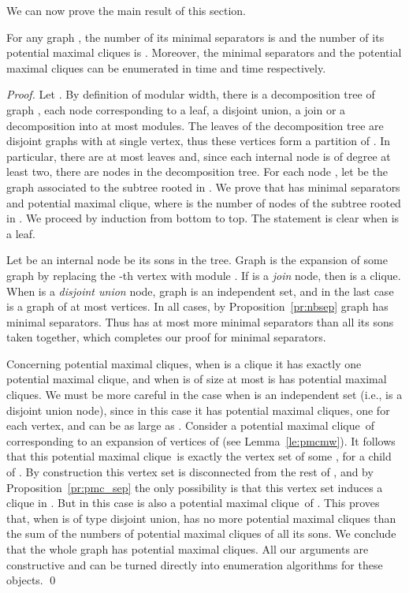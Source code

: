\documentclass{llncs}
\newcommand{\pmc}{potential maximal clique}
\begin{document}
We can now prove the main result of this section.
\begin{theorem}\label{th:sepmw}\label{th:pmcmw}
For any graph , the number of its minimal separators is  and the number of its potential maximal cliques is . Moreover, the minimal separators and the potential maximal cliques can be enumerated in time  and  time respectively.
\end{theorem}
\begin{proof}
Let . By definition of modular width, there is a decomposition tree of graph , each node corresponding to a leaf, a disjoint union, a join or a decomposition into at most  modules. The leaves of the decomposition tree are disjoint graphs with at single vertex, thus these vertices form a partition of . In particular, there are at most  leaves and, since each internal node is of degree at least two, there are  nodes in the decomposition tree. For each node , let  be the graph associated to the subtree rooted in . We prove that   has  minimal separators and  \pmc, where  is the number of nodes of the subtree rooted in . We proceed by induction from bottom to top. The statement is clear when  is a leaf.

Let  be an internal node  be its sons in the tree. 
Graph  is the expansion of some graph  by replacing the -th vertex with module . If  is a \emph{join} node, then  is a clique. When  is a \emph{disjoint union} node, graph  is an independent set, and in the last case  is a graph of at most  vertices. In all cases, by Proposition~\ref{pr:nbsep} graph  has   minimal separators. Thus  has at most  more minimal separators than all its sons taken together, which completes our proof for minimal separators. 

Concerning potential maximal cliques, when  is a clique it has exactly one potential maximal clique, and when  is of size at most  is has  \pmc s. We must be more careful in the case when  is an independent set (i.e.,  is a disjoint union node), since in this case it has  \pmc s, one for each vertex, and  can be as large as . Consider a \pmc\  of  corresponding to an expansion of vertices of  (see Lemma~\ref{le:pmcmw}).  It follows that this \pmc\ is exactly the vertex set of some , for a child  of . By construction this vertex set is disconnected from the rest of , and by Proposition~\ref{pr:pmc_sep} the only possibility is that this vertex set induces a clique in . But in this case  is also a \pmc\ of . This proves that, when  is of type disjoint union,  has no more \pmc s than the sum of the numbers of \pmc s of all its sons. We conclude that the whole graph  has   \pmc s. All our arguments are constructive and can be turned directly into enumeration algorithms for these objects.
\qed
\end{proof}
\end{document}
